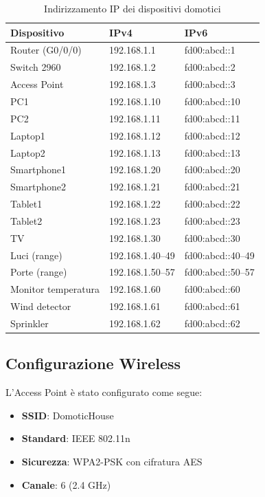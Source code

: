 \documentclass[a4paper,12pt]{article}
\begin{document}
\begin{table}[H]
\centering
\begin{tabular}{|l|l|l|}
\hline
\textbf{Dispositivo} & \textbf{IPv4} & \textbf{IPv6} \\
\hline
Router (G0/0/0) & 192.168.1.1 & fd00:abcd::1 \\
Switch 2960 & 192.168.1.2 & fd00:abcd::2 \\
Access Point & 192.168.1.3 & fd00:abcd::3 \\
PC1 & 192.168.1.10 & fd00:abcd::10 \\
PC2 & 192.168.1.11 & fd00:abcd::11 \\
Laptop1 & 192.168.1.12 & fd00:abcd::12 \\
Laptop2 & 192.168.1.13 & fd00:abcd::13 \\
Smartphone1 & 192.168.1.20 & fd00:abcd::20 \\
Smartphone2 & 192.168.1.21 & fd00:abcd::21 \\
Tablet1 & 192.168.1.22 & fd00:abcd::22 \\
Tablet2 & 192.168.1.23 & fd00:abcd::23 \\
TV & 192.168.1.30 & fd00:abcd::30 \\
Luci (range) & 192.168.1.40–49 & fd00:abcd::40–49 \\
Porte (range) & 192.168.1.50–57 & fd00:abcd::50–57 \\
Monitor temperatura & 192.168.1.60 & fd00:abcd::60 \\
Wind detector & 192.168.1.61 & fd00:abcd::61 \\
Sprinkler & 192.168.1.62 & fd00:abcd::62 \\
\hline
\end{tabular}
\caption{Indirizzamento IP dei dispositivi domotici}
\end{table}

\subsection{Configurazione Wireless}

L’Access Point è stato configurato come segue:

\begin{itemize}
    \item \textbf{SSID}: DomoticHouse
    \item \textbf{Standard}: IEEE 802.11n
    \item \textbf{Sicurezza}: WPA2-PSK con cifratura AES
    \item \textbf{Canale}: 6 (2.4 GHz)
\end{itemize}
\end{document}

